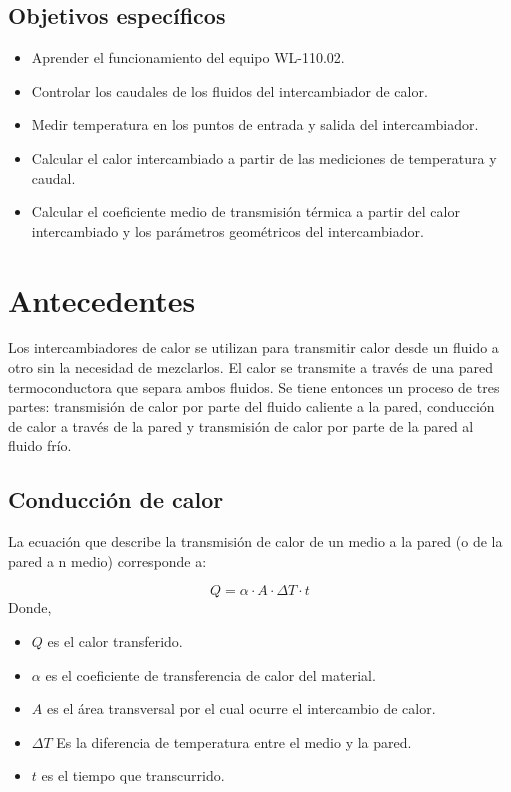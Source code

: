 \documentclass[letterpaper,11pt]{article} %
\begin{document}
\subsection{Objetivos específicos}
\begin{itemize}
    \item Aprender el funcionamiento del equipo WL-110.02.
    \item Controlar los caudales de los fluidos del intercambiador de calor.
    \item Medir temperatura en los puntos de entrada y salida del intercambiador.
    \item Calcular el calor intercambiado a partir de las mediciones de temperatura y caudal.
    \item Calcular el coeficiente medio de transmisión térmica a partir del calor intercambiado y los parámetros geométricos del intercambiador.
\end{itemize}
		
\newpage
\section{Antecedentes}
Los intercambiadores de calor se utilizan para transmitir calor desde un fluido a otro sin la necesidad de mezclarlos. El calor se transmite a través de una pared termoconductora que separa ambos fluidos.
Se tiene entonces un proceso de tres partes: transmisión de calor por parte del fluido caliente a la pared, conducción de calor a través de la pared y transmisión de calor por parte de la pared al fluido frío.
\subsection{Conducción de calor}
La ecuación que describe la transmisión de calor de un medio a la pared (o de la pared a n medio) corresponde a:

\begin{equation}
    Q = \alpha \cdot A \cdot \Delta T \cdot t
\end{equation}
 Donde, 
 \begin{itemize}
     \item $Q$ es el calor transferido.
     \item $\alpha$ es el coeficiente de transferencia de calor del material.
     \item $A$ es el área transversal por el cual ocurre el intercambio de calor.
     \item $\Delta T$ Es la diferencia de temperatura entre el medio y la pared.
     \item $t$ es el tiempo que transcurrido.
 \end{itemize} 
 
\end{document}
